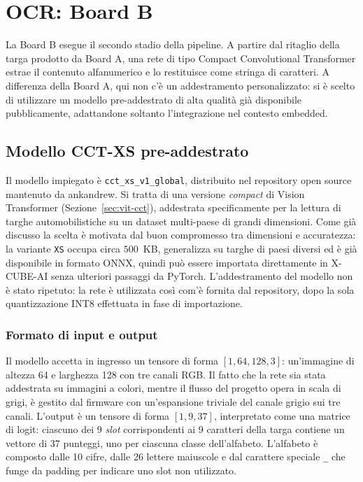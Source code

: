 \chapter{OCR: Board B}
\label{cap:ocr}

La Board B esegue il secondo stadio della pipeline. A partire dal ritaglio della targa prodotto da Board A, una rete di tipo Compact Convolutional Transformer estrae il contenuto alfanumerico e lo restituisce come stringa di caratteri. A differenza della Board A, qui non c'è un addestramento personalizzato: si è scelto di utilizzare un modello pre-addestrato di alta qualità già disponibile pubblicamente, adattandone soltanto l'integrazione nel contesto embedded.

\section{Modello CCT-XS pre-addestrato}
\label{sec:cct-xs}

Il modello impiegato è \texttt{cct\_xs\_v1\_global}, distribuito nel repository open source\cite{ankandrew_2024_fastplateocr} mantenuto da ankandrew. Si tratta di una versione \textit{compact} di Vision Transformer (Sezione~\ref{sec:vit-cct}), addestrata specificamente per la lettura di targhe automobilistiche su un dataset multi-paese di grandi dimensioni. Come già discusso la scelta è motivata dal buon compromesso tra dimensioni e accuratezza: la variante \texttt{XS} occupa circa $500$~KB, generalizza su targhe di paesi diversi ed è già disponibile in formato ONNX, quindi può essere importata direttamente in X-CUBE-AI senza ulteriori passaggi da PyTorch. L'addestramento del modello non è stato ripetuto: la rete è utilizzata così com'è fornita dal repository, dopo la sola quantizzazione INT8 effettuata in fase di importazione.

\subsection{Formato di input e output}
\label{sec:io-cct}

Il modello accetta in ingresso un tensore di forma $[1, 64, 128, 3]$: un'immagine di altezza 64 e larghezza 128 con tre canali RGB. Il fatto che la rete sia stata addestrata su immagini a colori, mentre il flusso del progetto opera in scala di grigi, è gestito dal firmware con un'espansione triviale del canale grigio sui tre canali. L'output è un tensore di forma $[1, 9, 37]$, interpretato come una matrice di logit: ciascuno dei 9 \textit{slot} corrispondenti ai 9 caratteri della targa contiene un vettore di 37 punteggi, uno per ciascuna classe dell'alfabeto. L'alfabeto è composto dalle 10 cifre, dalle 26 lettere maiuscole e dal carattere speciale \texttt{\_} che funge da padding per indicare uno slot non utilizzato.

